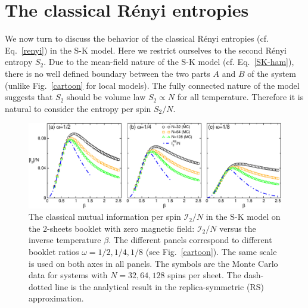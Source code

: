\documentclass[twocolumn,superscriptaddress,prb,10pt]{revtex4-1}
\begin{document}
\section{The classical R\'enyi entropies}
\label{Renyi-section}

We now turn to discuss the behavior of the classical R\'enyi entropies (cf. 
Eq.~\eqref{renyi}) in the S-K model. Here we restrict ourselves to the second R\'enyi 
entropy $S_2$. Due to the mean-field nature of the S-K model (cf. Eq.~\eqref{SK-ham}), 
there is no well defined boundary between the two parts $A$ and $B$ of the system (unlike Fig.~\ref{cartoon} for local models).
The fully connected nature of the model suggests that $S_2$ should be volume law $S_2 \propto N$ for all temperature.
Therefore it is natural to consider the entropy per spin $S_2/N$. 

\begin{figure}[t]
\includegraphics*[width=0.93\linewidth]{./draft_figs/I2_MC_v1}
\caption{The classical mutual information per spin ${\mathcal I}_2/N$ 
 in the S-K model on the $2$-sheets booklet with zero magnetic field: 
 ${\mathcal I}_2/N$ versus the inverse temperature $\beta$. The 
 different panels correspond to different booklet ratios $\omega=1/2,1/4,1/8$ 
 (see Fig.~\ref{cartoon}). The same scale is used on both axes in all 
 panels. The symbols are the Monte Carlo data 
 for systems with $N=32,64,128$ spins per sheet. The dash-dotted line is 
 the analytical result in the replica-symmetric (RS) approximation.  
}
\label{I2-MC}
\end{figure}
\end{document}
